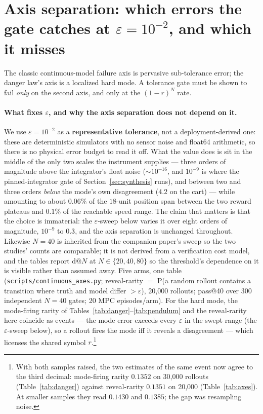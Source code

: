 \documentclass[11pt]{article}
\theoremstyle{definition}
\theoremstyle{remark}
\begin{document}
\section{Axis separation: which errors the gate catches at \texorpdfstring{$\varepsilon = 10^{-2}$}{eps = 1e-2}, and which it misses}
\label{sec:axes}

The classic continuous-model failure axis is pervasive sub-tolerance error; the danger law's axis is a localized hard mode. A tolerance gate must be shown to fail \emph{only} on the second axis, and only at the $(1-r)^N$ rate.

\paragraph{What fixes $\varepsilon$, and why the axis separation does not depend on it.} We use $\varepsilon = 10^{-2}$ as a \textbf{representative tolerance}, not a deployment-derived one: these are deterministic simulators with no sensor noise and float64 arithmetic, so there is no physical error budget to read it off. What the value does is sit in the middle of the only two scales the instrument supplies --- three orders of magnitude above the integrator's float noise ($\sim\!10^{-16}$, and $10^{-9}$ is where the pinned-integrator gate of Section~\ref{sec:synthesis} runs), and between two and three orders \emph{below} the mode's own disagreement ($4.2$ on the cart) --- while amounting to about $0.06\%$ of the $18$-unit position span between the two reward plateaus and $0.1\%$ of the reachable speed range. The claim that matters is that the choice is immaterial: the $\varepsilon$-sweep below varies it over eight orders of magnitude, $10^{-9}$ to $0.3$, and the axis separation is unchanged throughout. Likewise $N = 40$ is inherited from the companion paper's sweep so the two studies' counts are comparable; it is not derived from a verification cost model, and the tables report $\mathrm{d@}N$ at $N \in \{20, 40, 80\}$ so the threshold's dependence on it is visible rather than assumed away. Five arms, one table (\texttt{scripts/continuous\_axes.py}; reveal-rarity $=$ P(a random rollout contains a transition where truth and model differ $> \varepsilon$), 20{,}000 rollouts; pass@40 over 300 independent $N{=}40$ gates; 20 MPC episodes/arm). For the hard mode, the mode-firing rarity of Tables~\ref{tab:danger}--\ref{tab:pendulum} and the reveal-rarity here coincide as events --- the mode error exceeds every $\varepsilon$ in the swept range (the $\varepsilon$-sweep below), so a rollout fires the mode iff it reveals a disagreement --- which licenses the shared symbol $r$.\footnote{With both samples raised, the two estimates of the same event now agree to the third decimal: mode-firing rarity $0.1352$ on 30{,}000 rollouts (Table~\ref{tab:danger}) against reveal-rarity $0.1351$ on 20{,}000 (Table~\ref{tab:axes}). At smaller samples they read $0.1430$ and $0.1385$; the gap was resampling noise.}
\end{document}
